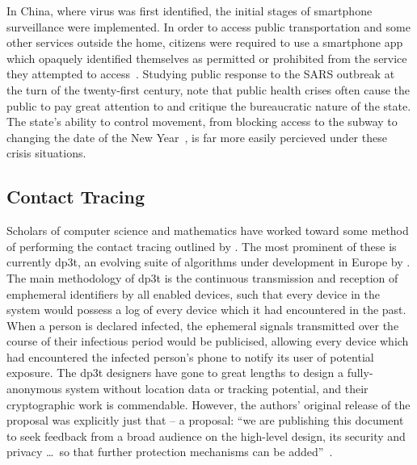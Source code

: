 \documentclass[russian,american]{../../../coursework}
\begin{document}
In China, where \ac{virus} was first identified, the initial stages of smartphone
surveillance were implemented. In order to access public transportation and some
other services outside the home, citizens were required to use a smartphone app
which opaquely identified themselves as permitted or prohibited from the service
they attempted to access~\parencite{NYT.alipay}.
Studying public response to the SARS outbreak at the turn of the twenty-first century,
\textcite{Lee2009} note that public health crises often cause the public
to pay great attention to and critique the bureaucratic nature of the state.
The state's ability to control movement, from blocking access to the subway to
changing the date of the New Year~\parencite{Chen2020}, is far more easily percieved
under these crisis situations.

\subsection{Contact Tracing}

Scholars of computer science and mathematics have worked toward some method of
performing the contact tracing outlined by \textcite{Ferretti2020}. The most
prominent of these is currently \ac{dp3t}, an evolving suite of algorithms
under development in Europe by \textcite{DP-3T}. The main methodology of
\ac{dp3t} is the continuous transmission and reception of emphemeral identifiers
by all enabled devices, such that every device in the system would possess a log
of every device which it had encountered in the past. When a person is declared
infected, the ephemeral signals transmitted over the course of their
infectious period would be publicised, allowing every device which had
encountered the infected person's phone to notify its user of potential exposure.
The \ac{dp3t} designers have gone to great lengths to design a fully-anonymous
system without location data or tracking potential, and their cryptographic work
is commendable. However, the authors' original release of the proposal was
explicitly just that -- a proposal: \enquote{we are publishing this document to
seek feedback from a broad audience on the high-level design, its security and
privacy \dots\ so that further protection mechanisms can be added}~\parencite[2]{DP-3T}.
\end{document}
